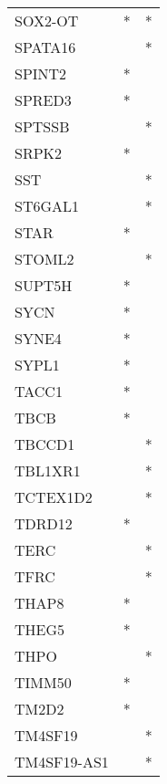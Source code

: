 \begin{longtable}{lcc}
SOX2-OT          &              * &          * \\
SPATA16          &                &          * \\
SPINT2           &              * &            \\
SPRED3           &              * &            \\
SPTSSB           &                &          * \\
SRPK2            &              * &            \\
SST              &                &          * \\
ST6GAL1          &                &          * \\
STAR             &              * &            \\
STOML2           &                &          * \\
SUPT5H           &              * &            \\
SYCN             &              * &            \\
SYNE4            &              * &            \\
SYPL1            &              * &            \\
TACC1            &              * &            \\
TBCB             &              * &            \\
TBCCD1           &                &          * \\
TBL1XR1          &                &          * \\
TCTEX1D2         &                &          * \\
TDRD12           &              * &            \\
TERC             &                &          * \\
TFRC             &                &          * \\
THAP8            &              * &            \\
THEG5            &              * &            \\
THPO             &                &          * \\
TIMM50           &              * &            \\
TM2D2            &              * &            \\
TM4SF19          &                &          * \\
TM4SF19-AS1      &                &          * \\

\end{longtable}

